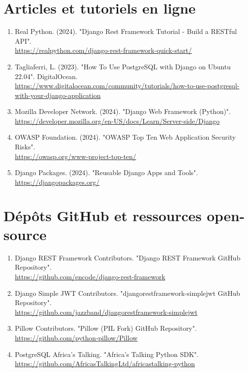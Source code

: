\section{Articles et tutoriels en ligne}

\begin{enumerate}
    \item Real Python. (2024). "Django Rest Framework Tutorial - Build a RESTful API". \\
    \url{https://realpython.com/django-rest-framework-quick-start/}

    \item Tagliaferri, L. (2023). "How To Use PostgreSQL with Django on Ubuntu 22.04". DigitalOcean. \\
    \url{https://www.digitalocean.com/community/tutorials/how-to-use-postgresql-with-your-django-application}

    \item Mozilla Developer Network. (2024). "Django Web Framework (Python)". \\
    \url{https://developer.mozilla.org/en-US/docs/Learn/Server-side/Django}

    \item OWASP Foundation. (2024). "OWASP Top Ten Web Application Security Risks". \\
    \url{https://owasp.org/www-project-top-ten/}

    \item Django Packages. (2024). "Reusable Django Apps and Tools". \\
    \url{https://djangopackages.org/}
\end{enumerate}

\section{Dépôts GitHub et ressources open-source}

\begin{enumerate}
    \item Django REST Framework Contributors. "Django REST Framework GitHub Repository". \\
    \url{https://github.com/encode/django-rest-framework}

    \item Django Simple JWT Contributors. "djangorestframework-simplejwt GitHub Repository". \\
    \url{https://github.com/jazzband/djangorestframework-simplejwt}

    \item Pillow Contributors. "Pillow (PIL Fork) GitHub Repository". \\
    \url{https://github.com/python-pillow/Pillow}

    \item PostgreSQL Africa's Talking. "Africa's Talking Python SDK". \\
    \url{https://github.com/AfricasTalkingLtd/africastalking-python}
\end{enumerate}

